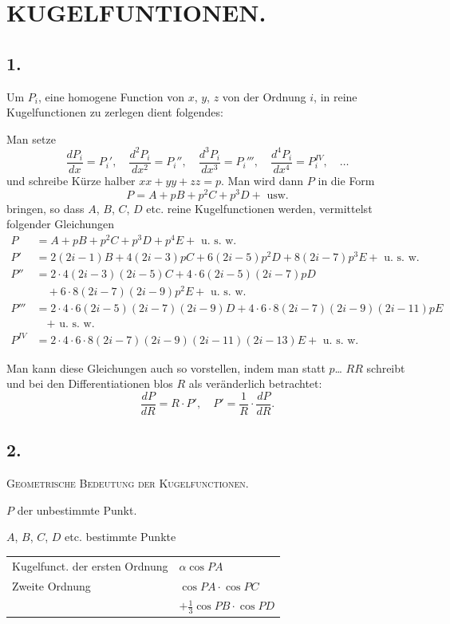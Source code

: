 \documentclass[fontsize=10pt,paper=a5,pagesize=auto]{scrbook}
\newcommand{\origpage}[1]{\marginpar{\footnotesize\textit{S. #1}}}
\begin{document}
\section*{KUGELFUNTIONEN.}
\label{sec:kugelfunktionen}

\subsection*{1.}
\origpage{636}
Um $P_i$, eine homogene Function von $x$, $y$, $z$ von der Ordnung $i$, in reine Kugelfunctionen zu zerlegen dient folgendes:

Man setze
\[
\frac{dP_i}{dx} = P_i', \quad \frac{d^2P_i}{dx^2} = P_i'', \quad \frac{d^3P_i}{dx^3} = P_i''', \quad \frac{d^4P_i}{dx^4} = P_i^{IV}, \quad \dots
\]
und schreibe Kürze halber $xx + yy + zz = p$. Man wird dann $P$ in die Form
\[
P = A + pB + p^2C + p^3D + \text{ usw.}
\]
bringen, so dass $A$, $B$, $C$, $D$ etc. reine Kugelfunctionen werden, vermittelst folgender Gleichungen
\begin{align*}
P &= A + pB + p^2C + p^3D + p^4E + \text{ u.~s.~w.}\\
P' &= 2(2i - 1)B + 4(2i - 3)pC + 6(2i - 5)p^2D + 8(2i - 7)p^3E + \text{ u.~s.~w.}\\
P'' &= 2 \cdot 4(2i - 3)(2i - 5)C + 4 \cdot 6(2i - 5)(2i - 7)pD\\
&\quad + 6 \cdot 8(2i - 7)(2i - 9)p^2E + \text{ u.~s.~w.}\\
P''' &= 2 \cdot 4 \cdot 6(2i - 5)(2i - 7)(2i - 9)D + 4 \cdot 6 \cdot 8(2i - 7)(2i - 9)(2i - 11)pE\\
&\quad + \text{ u.~s.~w.}\\
P^{IV} &= 2 \cdot 4 \cdot 6 \cdot 8(2i - 7)(2i - 9)(2i - 11)(2i - 13)E + \text{ u.~s.~w.}
\end{align*}

Man kann diese Gleichungen auch so vorstellen, indem man statt $p$\dots{} $RR$ schreibt und bei den Differentiationen blos $R$ als veränderlich betrachtet:
\[
\frac{dP}{dR} = R \cdot P', \quad P' = \frac{1}{R} \cdot \frac{dP}{dR}.
\]

\subsection*{2.}
\origpage{637}
\textsc{Geometrische Bedeutung der Kugelfunctionen.}

$P$ der unbestimmte Punkt.

$A$, $B$, $C$, $D$ etc. bestimmte Punkte

\begin{tabular}{@{}ll@{}}
Kugelfunct. der ersten Ordnung & $\alpha \cos PA$ \\
Zweite Ordnung & $\cos PA \cdot \cos PC$ \\
& $+ \tfrac{1}{3} \cos PB \cdot \cos PD$ \\
\end{tabular}
\end{document}
